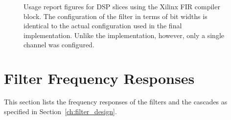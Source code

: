 \begin{figure}
    \centering
    
    \caption[Usage Report FIR Compiler]{%
        Usage  report figures  for DSP  slices using  the Xilinx  FIR compiler
        block. The  configuration  of  the  filter in  terms  of  bit  widths
        is  identical   to  the  actual   configuration  used  in   the  final
        implementation. Unlike  the  implementation,  however, only  a  single
        channel was configured.%
    }
    \label{fig:usage_report}
\end{figure}

%
%
\section{Filter Frequency Responses} %
\label{sec:filter_frequency_responses}

This section lists the frequency responses  of the filters and the cascades as
specified in Section~\ref{ch:filter_design}.
%
%
\subsection{} %
\label{sec:filter_frequency_responses:5steep}

%
%
\subsection{} %
\label{sec:filter_frequency_responses:5flat}

%
%
